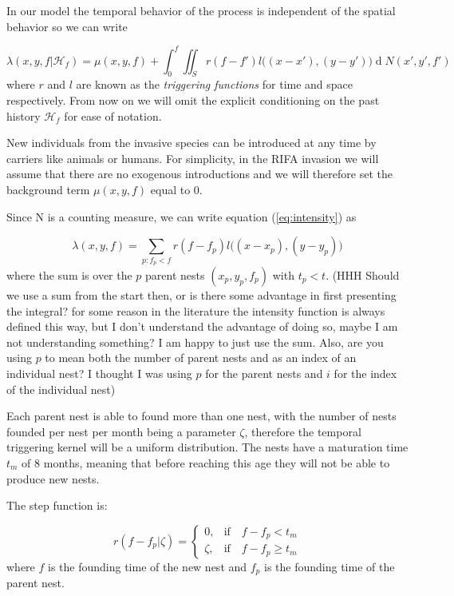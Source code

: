 \documentclass{article}
\renewcommand{\d}[1]{\ensuremath{\operatorname{d}\!{#1}}}
\begin{document}
In our model the temporal behavior of the process is independent of the spatial behavior so we can write

\begin{equation*}
    \lambda(x, y, f | \mathcal{H}_f) = \mu(x, y, f) + \int_{0}^{f} \iint_{S} r(f-f') l\Big((x - x'), (y - y')\Big) \d N(x', y', f')
\end{equation*}
where $r$ and $l$ are known as the {\em triggering functions} for time and space respectively. From now on we will omit the explicit conditioning on the past history $\mathcal{H}_f$ for ease of notation.

New individuals from the invasive species can be introduced at any time by carriers like animals or humans. For simplicity, in the RIFA invasion we will assume that there are no exogenous introductions and we will therefore set the background term $\mu(x, y, f) $ equal to 0.

Since N is a counting measure, we can write equation (\ref{eq:intensity}) as

\begin{equation*}
    \lambda(x, y, f) = \sum_{ p: f_p < f } r(f - f_p) l \Big((x - x_p),(y - y_p) \Big)
\end{equation*}
where the sum is over the $p$ parent nests $(x_p, y_p, f_p)$ with $t_p < t$. (HHH Should we use a sum from the start then, or is there some advantage in first presenting the integral? {\color{red}for some reason in the literature the intensity function is always defined this way, but I don't understand the advantage of doing so, maybe I am not understanding something? I am happy to just use the sum.} Also, are you using $p$ to mean both the number of parent nests and as an index of an individual nest? {\color{red}I thought I was using $p$ for the parent nests and $i$ for the index of the individual nest})

Each parent nest is able to found more than one nest, with the number of nests founded per nest per month being a parameter $\zeta$, therefore the temporal triggering kernel will be a {\color{red}uniform distribution}. The nests have a maturation time $t_m$ of 8 months, meaning that before reaching this age they will not be able to produce new nests. 

The step function is:

\begin{equation*}
    r (f - f_p | \zeta) =
    \begin{cases}
        0, & \mbox{if} \quad f - f_p < t_{m} \\
        \zeta, & \mbox{if} \quad f - f_p \geq t_{m}
    \end{cases}
\end{equation*}
where $f$ is the founding time of the new nest and $f_p$ is the founding time of the parent nest.
\end{document}
